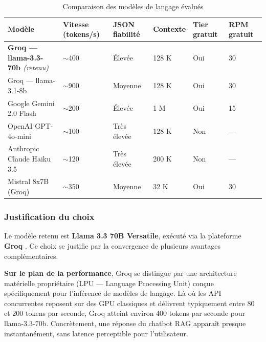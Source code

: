 \begin{table}[H]
\centering
\renewcommand{\arraystretch}{1.4}
\begin{tabular}{|p{3.8cm}|p{2cm}|p{2cm}|p{2.2cm}|p{1.8cm}|p{2cm}|}
\hline
\textbf{Modèle} & \textbf{Vitesse} \newline (tokens/s)
                & \textbf{JSON} \newline \textbf{fiabilité}
                & \textbf{Contexte}
                & \textbf{Tier} \newline \textbf{gratuit}
                & \textbf{RPM gratuit} \\
\hline

\textbf{Groq \cite{groq} — llama-3.3-70b \cite{llama3}} \newline \textit{(retenu)}
    & $\sim$400 & Élevée & 128 K & Oui & 30 \\
\hline

Groq \cite{groq} — llama-3.1-8b \cite{llama3}
    & $\sim$900 & Moyenne & 128 K & Oui & 30 \\
\hline

Google Gemini 2.0 Flash \cite{gemini}
    & $\sim$200 & Élevée & 1 M & Oui & 15 \\
\hline

OpenAI GPT-4o-mini \cite{openai}
    & $\sim$100 & Très élevée & 128 K & Non & — \\
\hline

Anthropic Claude Haiku 3.5 \cite{anthropic}
    & $\sim$120 & Très élevée & 200 K & Non & — \\
\hline

Mistral 8x7B (Groq) \cite{mistral}
    & $\sim$350 & Moyenne & 32 K & Oui & 30 \\
\hline

\end{tabular}
\caption{Comparaison des modèles de langage évalués}
\label{tab:model_comparison}
\end{table}

\subsubsection*{Justification du choix}

Le modèle retenu est \textbf{Llama 3.3 70B Versatile}, exécuté via la plateforme
\textbf{Groq} \cite{groq}. Ce choix se justifie par la convergence de plusieurs avantages
complémentaires.

\textbf{Sur le plan de la performance}, Groq se distingue par une architecture
matérielle propriétaire (LPU — Language Processing Unit) conçue spécifiquement
pour l'inférence de modèles de langage. Là où les API concurrentes reposent sur
des GPU classiques et délivrent typiquement entre 80 et 200 tokens par seconde,
Groq atteint environ 400 tokens par seconde pour llama-3.3-70b. Concrètement,
une réponse du chatbot RAG apparaît presque instantanément, sans latence
perceptible pour l'utilisateur.

